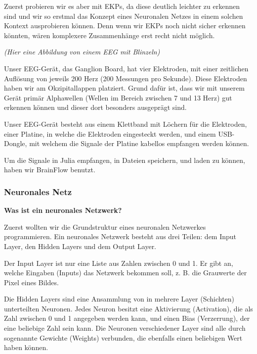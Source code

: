 \documentclass{scrartcl}
\begin{document}
	Zuerst probieren wir es aber mit EKPs, da diese deutlich leichter zu erkennen sind und wir so erstmal das Konzept eines Neuronalen Netzes in einem solchen Kontext ausprobieren können. Denn wenn wir EKPs noch nicht sicher erkennen könnten, wären komplexere Zusammenhänge erst recht nicht möglich.
	
	\textit{(Hier eine Abbildung von einem EEG mit Blinzeln) }
	
	Unser EEG-Gerät, das Ganglion Board, hat vier Elektroden, mit einer zeitlichen Auflösung von jeweils 200 Herz (200 Messungen pro Sekunde). Diese Elektroden haben wir am Okzipitallappen platziert. Grund dafür ist, dass wir mit unserem Gerät primär Alphawellen (Wellen im Bereich zwischen 7 und 13 Herz) gut erkennen können und dieser dort besonders ausgeprägt sind. 
	
	
	Unser EEG-Gerät besteht aus einem Klettband mit Löchern für die Elektroden, einer Platine, in welche die Elektroden eingesteckt werden, und einem USB-Dongle, mit welchem die Signale der Platine kabellos empfangen werden können. 
	
	
	Um die Signale in Julia empfangen, in Dateien speichern, und laden zu können, haben wir BrainFlow benutzt. 

	\subsubsection{Neuronales Netz}


	\vspace{1ex}
	\noindent \textbf{Was ist ein neuronales Netzwerk?}
	\vspace{0.5ex}

	Zuerst wollten wir die Grundstruktur eines neuronalen Netzwerkes programmieren. Ein neuronales Netzwerk besteht aus drei Teilen: dem Input Layer, den Hidden Layers und dem Output Layer.

	Der Input Layer ist nur eine Liste aus Zahlen zwischen 0 und 1. Er gibt an, welche Eingaben (Inputs) das Netzwerk bekommen soll, z. B. die Grauwerte der Pixel eines Bildes.

	Die Hidden Layers sind eine Ansammlung von in mehrere Layer (Schichten) unterteilten Neuronen. Jedes Neuron besitzt eine Aktivierung (Activation), die als Zahl zwischen 0 und 1 angegeben werden kann, und einen Bias (Verzerrung), der eine beliebige Zahl sein kann. Die Neuronen verschiedener Layer sind alle durch sogenannte Gewichte (Weights) verbunden, die ebenfalls einen beliebigen Wert haben können.  
\end{document}
